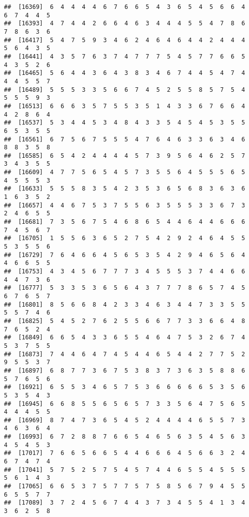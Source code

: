 \documentclass[
]{book}
\begin{document}
\begin{verbatim}
##  [16369]  6  4  4  4  4  6  7  6  6  5  4  3  6  5  4  5  6  6  4  6  7  4  4  5
##  [16393]  4  7  4  4  2  6  6  4  6  3  4  4  4  5  5  4  7  8  6  7  8  6  3  6
##  [16417]  5  4  7  5  9  3  4  6  2  4  6  4  6  4  4  2  4  4  4  5  6  4  3  5
##  [16441]  4  3  5  7  6  3  7  4  7  7  7  5  4  5  7  7  6  6  5  4  3  5  2  6
##  [16465]  5  6  4  4  3  6  4  3  8  3  4  6  7  4  4  5  4  7  4  4  4  5  5  7
##  [16489]  5  5  5  3  3  5  6  6  7  4  5  2  5  5  8  5  7  5  4  5  5  5  9  3
##  [16513]  6  6  6  3  5  7  5  5  3  5  1  4  3  3  6  7  6  6  4  4  2  8  6  4
##  [16537]  5  3  4  4  5  3  4  8  4  3  3  5  4  5  4  5  3  5  5  6  5  3  5  5
##  [16561]  6  7  5  6  7  5  5  5  4  7  6  4  6  3  3  6  3  4  6  8  8  3  5  8
##  [16585]  6  5  4  2  4  4  4  4  5  7  3  9  5  6  4  6  2  5  7  3  4  3  5  5
##  [16609]  4  7  7  5  6  5  4  5  7  3  5  5  6  4  5  5  5  6  5  4  5  5  5  3
##  [16633]  5  5  5  8  3  5  4  2  3  5  3  6  5  6  8  3  6  3  6  1  6  3  5  2
##  [16657]  4  4  6  7  5  3  7  5  5  6  3  5  5  5  3  3  6  7  3  2  4  6  5  5
##  [16681]  7  3  5  6  7  5  4  6  8  6  5  4  4  6  4  4  6  6  6  7  4  5  6  7
##  [16705]  1  5  5  6  3  6  5  2  7  5  4  2  9  2  4  6  4  5  5  5  3  5  5  6
##  [16729]  7  6  4  6  6  4  5  6  5  3  5  4  2  9  4  6  5  6  4  4  6  6  5  5
##  [16753]  4  3  4  5  6  7  7  7  3  4  5  5  5  3  7  4  4  6  6  4  4  7  3  6
##  [16777]  5  3  3  5  3  6  5  6  4  3  7  7  7  8  6  5  7  4  5  6  7  6  5  7
##  [16801]  8  5  6  6  8  4  2  3  3  4  6  3  4  4  7  3  3  5  5  5  5  7  4  6
##  [16825]  5  4  5  2  7  6  2  5  5  6  6  7  7  3  3  6  6  4  8  7  6  5  2  4
##  [16849]  6  6  5  4  3  3  6  5  5  4  6  4  7  5  3  2  6  7  4  5  3  7  5  5
##  [16873]  7  4  4  6  4  7  4  5  4  4  6  5  4  4  2  7  7  5  2  9  5  5  3  7
##  [16897]  6  8  7  7  3  6  7  5  3  8  3  7  3  6  3  5  8  8  6  5  7  6  5  6
##  [16921]  6  5  5  3  4  6  5  7  5  3  6  6  6  6  6  5  3  5  6  5  3  5  4  3
##  [16945]  6  6  8  5  5  6  5  6  5  7  3  3  5  6  4  7  5  6  5  4  4  4  5  5
##  [16969]  8  7  4  7  3  6  5  4  5  2  4  4  4  4  6  5  5  7  3  4  6  3  6  4
##  [16993]  6  7  2  8  8  7  6  6  5  4  6  5  6  3  5  4  5  6  3  4  5  4  5  3
##  [17017]  7  6  6  5  6  6  5  4  4  6  6  6  4  5  6  6  3  2  4  6  7  4  7  4
##  [17041]  5  7  5  2  5  7  5  4  5  7  4  4  6  5  5  4  5  5  5  5  6  1  4  3
##  [17065]  6  6  5  3  7  5  7  7  5  7  5  8  5  6  7  9  4  5  5  6  5  5  7  7
##  [17089]  3  7  2  4  5  6  7  4  4  3  7  3  4  5  5  4  1  3  4  3  6  2  5  8

\end{verbatim}
\end{document}
